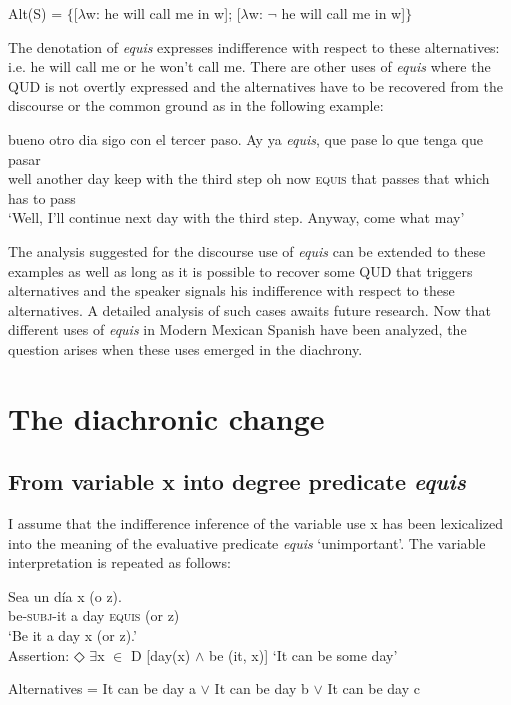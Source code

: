 \documentclass[output=paper]{langsci/langscibook}
\begin{document}
\ea\label{ex:kellert:56} Alt(S) = $\lbrace${[}$\lambda$w: he will call me in w{]}; {[}$\lambda$w: $¬$ he will call me in w{]}$\rbrace$
\z

The denotation of \textit{equis} expresses indifference with respect to these alternatives: i.e. he will call me or he won’t call me. There are other uses of \textit{equis} where the QUD is not overtly expressed and the alternatives have to be recovered from the discourse or the common ground as in the following example:

\ea\label{ex:kellert:57}
\gll bueno otro dia sigo con el tercer paso. Ay ya \textit{equis}, que pase lo que tenga que pasar\\
well another day keep with the third step oh now \textsc{equis} that passes that which has to pass\\
\glt ‘Well, I’ll continue next day with the third step. Anyway, come what may’
\z

The analysis suggested for the discourse use of \textit{equis} can be extended to these examples as well as long as it is possible to recover some QUD that triggers alternatives and the speaker signals his indifference with respect to these alternatives. A detailed analysis of such cases awaits future research.
Now that different uses of \textit{equis} in Modern Mexican Spanish have been analyzed, the question arises when these uses emerged in the diachrony.

\section{The diachronic change}\label{sec:kellert:4}

\subsection{From variable x into degree predicate \textit{equis}}\label{sec:kellert:4.1}
I assume that the indifference inference of the variable use x has been lexicalized into the meaning of the evaluative predicate \textit{equis} ‘unimportant’.  The variable interpretation is repeated as follows:

\ea\label{ex:kellert:58}
\gll Sea un día x (o z).\\
 be-\textsc{subj}-it a day \textsc{equis} (or z)\\
\glt ‘Be it a day x (or z).’\\
Assertion: ◇ $\exists$x $\in$ D {[}day(x) $\wedge$ be (it, x){]} ‘It can be some day’\par
Alternatives = It can be day a $\vee$ It can be day b $\vee$ It can be day c
\z
\end{document}
